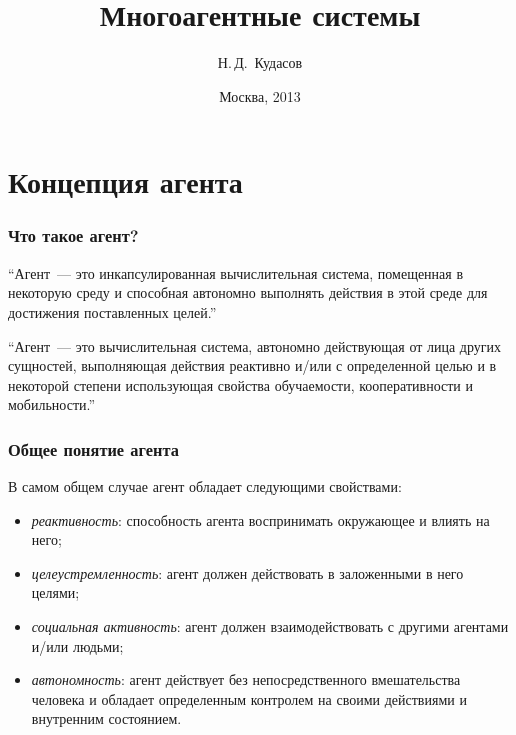 \documentclass{beamer}
\begin{document}
\title[]{Многоагентные системы}
\author{Н.\,Д.~Кудасов}
\date{Москва, 2013}

\begin{frame}
\addtocounter{framenumber}{-1}
\maketitle
\end{frame}

\section{Концепция агента}

\begin{frame}
  \frametitle{Что такое агент?}
  \begin{exampleblock}{}
    {\large ``Агент~--- это инкапсулированная вычислительная система,
    помещенная в некоторую среду и способная автономно выполнять действия
    в этой среде для достижения поставленных целей.''}
    \vskip5mm
    \hspace*{}
  \end{exampleblock}

  \begin{exampleblock}{}
    {\large ``Агент~--- это вычислительная система, автономно действующая от лица других
    сущностей, выполняющая действия реактивно и/или с определенной целью и в некоторой
    степени использующая свойства обучаемости, кооперативности и мобильности.''}
    \vskip5mm
    \hspace*{}
  \end{exampleblock}
\end{frame}

\begin{frame}
  \frametitle{Общее понятие агента}
  В самом общем случае агент обладает следующими свойствами:

  \begin{itemize}
    \item<1-> {\it реактивность}: способность агента воспринимать окружающее и влиять на него;
    \item<2-> {\it целеустремленность}: агент должен действовать в заложенными в него целями;
    \item<3-> {\it социальная активность}: агент должен взаимодействовать с другими агентами и/или людьми;
    \item<4-> {\it автономность}: агент действует без непосредственного вмешательства человека и обладает
      определенным контролем на своими действиями и внутренним состоянием.
  \end{itemize}
\end{frame}
\end{document}
